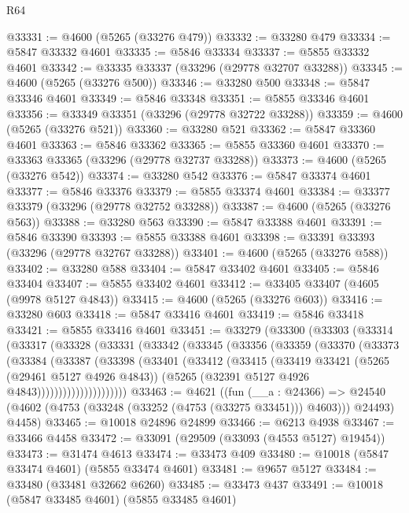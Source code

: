 \begin{lexlean}{R64}
\begin{coremodule}
@33331 := @4600 (@5265 (@33276 @479))
@33332 := @33280 @479
@33334 := @5847 @33332 @4601
@33335 := @5846 @33334
@33337 := @5855 @33332 @4601
@33342 := @33335 @33337 (@33296 (@29778 @32707 @33288))
@33345 := @4600 (@5265 (@33276 @500))
@33346 := @33280 @500
@33348 := @5847 @33346 @4601
@33349 := @5846 @33348
@33351 := @5855 @33346 @4601
@33356 := @33349 @33351 (@33296 (@29778 @32722 @33288))
@33359 := @4600 (@5265 (@33276 @521))
@33360 := @33280 @521
@33362 := @5847 @33360 @4601
@33363 := @5846 @33362
@33365 := @5855 @33360 @4601
@33370 := @33363 @33365 (@33296 (@29778 @32737 @33288))
@33373 := @4600 (@5265 (@33276 @542))
@33374 := @33280 @542
@33376 := @5847 @33374 @4601
@33377 := @5846 @33376
@33379 := @5855 @33374 @4601
@33384 := @33377 @33379 (@33296 (@29778 @32752 @33288))
@33387 := @4600 (@5265 (@33276 @563))
@33388 := @33280 @563
@33390 := @5847 @33388 @4601
@33391 := @5846 @33390
@33393 := @5855 @33388 @4601
@33398 := @33391 @33393 (@33296 (@29778 @32767 @33288))
@33401 := @4600 (@5265 (@33276 @588))
@33402 := @33280 @588
@33404 := @5847 @33402 @4601
@33405 := @5846 @33404
@33407 := @5855 @33402 @4601
@33412 := @33405 @33407 (@4605 (@9978 @5127 @4843))
@33415 := @4600 (@5265 (@33276 @603))
@33416 := @33280 @603
@33418 := @5847 @33416 @4601
@33419 := @5846 @33418
@33421 := @5855 @33416 @4601
@33451 := @33279
    (@33300
      (@33303
        (@33314
          (@33317
            (@33328
              (@33331
                (@33342
                  (@33345
                    (@33356
                      (@33359
                        (@33370
                          (@33373
                            (@33384
                              (@33387
                                (@33398
                                  (@33401
                                    (@33412
                                      (@33415
                                        (@33419
                                          @33421
                                          (@5265 (@29461 @5127 @4926 @4843))
                                          (@5265 (@32391 @5127 @4926 @4843)))))))))))))))))))))
@33463 := @4621
    ((fun (__a : @24366) =>
    @24540 (@4602 (@4753 (@33248 (@33252 (@4753 (@33275 @33451))) @4603))) @24493)
      @4458)
@33465 := @10018 @24896 @24899
@33466 := @6213 @4938
@33467 := @33466 @4458
@33472 := @33091 (@29509 (@33093 (@4553 @5127) @19454))
@33473 := @31474 @4613
@33474 := @33473 @409
@33480 := @10018 (@5847 @33474 @4601) (@5855 @33474 @4601)
@33481 := @9657 @5127
@33484 := @33480 (@33481 @32662 @6260)
@33485 := @33473 @437
@33491 := @10018 (@5847 @33485 @4601) (@5855 @33485 @4601)

\end{coremodule}
\end{lexlean}
